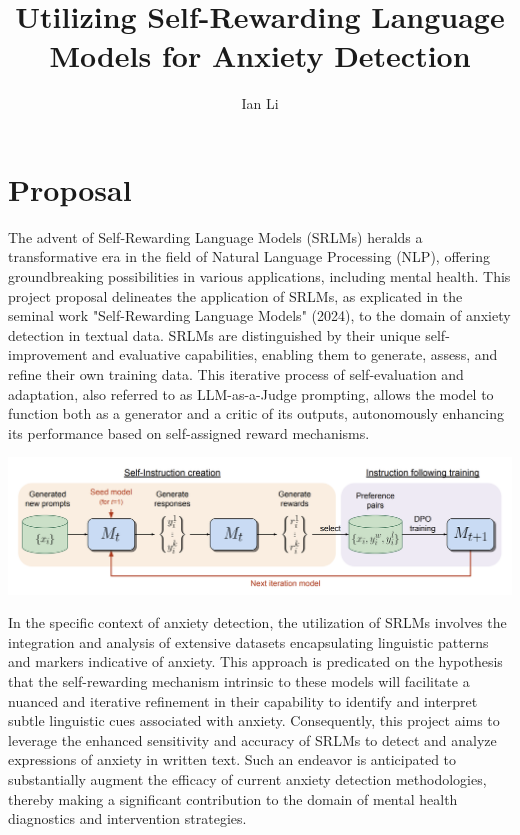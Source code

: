 \documentclass{article}
\title{Utilizing Self-Rewarding Language Models for Anxiety Detection}
\author{Ian Li}
\begin{document}
\maketitle

\section*{Proposal}


The advent of Self-Rewarding Language Models (SRLMs) heralds a transformative era in the field of Natural Language Processing (NLP), offering groundbreaking possibilities in various applications, including mental health. This project proposal delineates the application of SRLMs, as explicated in the seminal work "Self-Rewarding Language Models" (2024), to the domain of anxiety detection in textual data. SRLMs are distinguished by their unique self-improvement and evaluative capabilities, enabling them to generate, assess, and refine their own training data. This iterative process of self-evaluation and adaptation, also referred to as LLM-as-a-Judge prompting, allows the model to function both as a generator and a critic of its outputs, autonomously enhancing its performance based on self-assigned reward mechanisms.
\begin{center}
	\includegraphics[scale=0.4]{srlm.png}
\end{center}


In the specific context of anxiety detection, the utilization of SRLMs involves the integration and analysis of extensive datasets encapsulating linguistic patterns and markers indicative of anxiety. This approach is predicated on the hypothesis that the self-rewarding mechanism intrinsic to these models will facilitate a nuanced and iterative refinement in their capability to identify and interpret subtle linguistic cues associated with anxiety. Consequently, this project aims to leverage the enhanced sensitivity and accuracy of SRLMs to detect and analyze expressions of anxiety in written text. Such an endeavor is anticipated to substantially augment the efficacy of current anxiety detection methodologies, thereby making a significant contribution to the domain of mental health diagnostics and intervention strategies.
\end{document}
